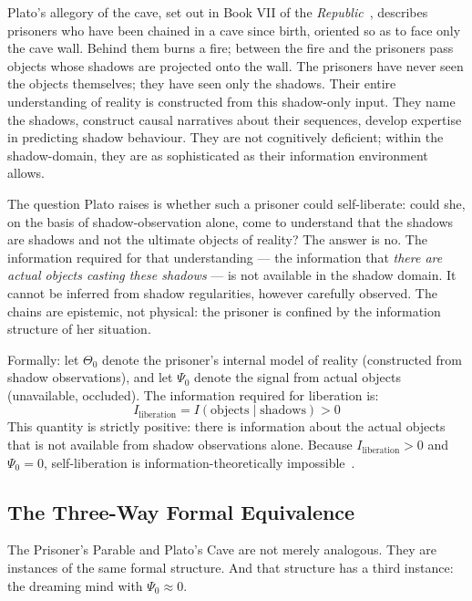 Plato's allegory of the cave, set out in Book VII of the \textit{Republic}~\cite{plato_republic}, describes prisoners who have been chained in a cave since birth, oriented so as to face only the cave wall. Behind them burns a fire; between the fire and the prisoners pass objects whose shadows are projected onto the wall. The prisoners have never seen the objects themselves; they have seen only the shadows. Their entire understanding of reality is constructed from this shadow-only input. They name the shadows, construct causal narratives about their sequences, develop expertise in predicting shadow behaviour. They are not cognitively deficient; within the shadow-domain, they are as sophisticated as their information environment allows.

The question Plato raises is whether such a prisoner could self-liberate: could she, on the basis of shadow-observation alone, come to understand that the shadows are shadows and not the ultimate objects of reality? The answer is no. The information required for that understanding --- the information that \textit{there are actual objects casting these shadows} --- is not available in the shadow domain. It cannot be inferred from shadow regularities, however carefully observed. The chains are epistemic, not physical: the prisoner is confined by the information structure of her situation.

Formally: let $\Theta_0$ denote the prisoner's internal model of reality (constructed from shadow observations), and let $\Psi_0$ denote the signal from actual objects (unavailable, occluded). The information required for liberation is:
%
\begin{equation}
I_{\mathrm{liberation}} = I(\text{objects} \mid \text{shadows}) > 0
\end{equation}
%
This quantity is strictly positive: there is information about the actual objects that is not available from shadow observations alone. Because $I_{\mathrm{liberation}} > 0$ and $\Psi_0 = 0$, self-liberation is information-theoretically impossible~\cite{author_dream}.

\subsection{The Three-Way Formal Equivalence}

The Prisoner's Parable and Plato's Cave are not merely analogous. They are instances of the same formal structure. And that structure has a third instance: the dreaming mind with $\Psi_0 \approx 0$.

